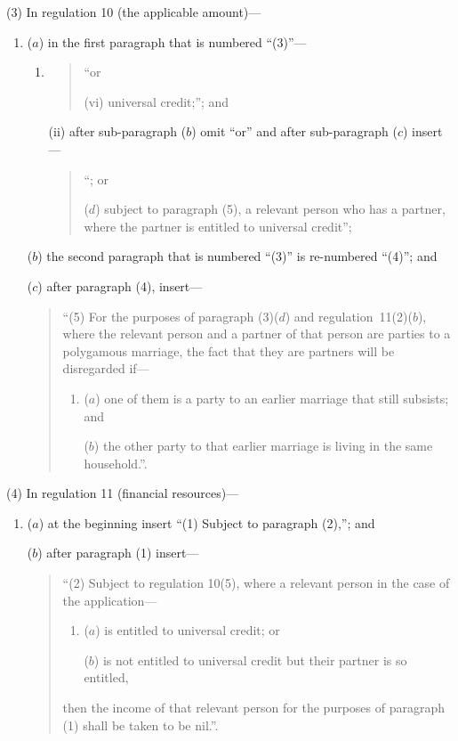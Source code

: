 \documentclass[12pt,a4paper]{article}
\begin{document}
(3) In regulation 10 (the applicable amount)—
\begin{enumerate}\item[]
($a$) in the first paragraph that is numbered “(3)”—
\begin{enumerate}\item[]
\begin{sloppypar}
\end{sloppypar}
\begin{quotation}
“or

(vi) universal credit;”; and
\end{quotation}

(ii) after sub-paragraph ($b$)  omit “or” and after sub-paragraph ($c$)  insert—
\begin{quotation}
“; or

($d$) subject to paragraph (5), a relevant person who has a partner, where the partner is entitled to universal credit”;
\end{quotation}
\end{enumerate}

($b$) the second paragraph that is numbered “(3)” is re-numbered “(4)”; and

($c$) after paragraph (4), insert—
\begin{quotation}
“(5) For the purposes of paragraph (3)($d$)  and regulation~11(2)($b$), where the relevant person and a partner of that person are parties to a polygamous marriage, the fact that they are partners will be disregarded if—
\begin{enumerate}\item[]
($a$) one of them is a party to an earlier marriage that still subsists; and

($b$) the other party to that earlier marriage is living in the same household.”.
\end{enumerate}
\end{quotation}
\end{enumerate}

(4) In regulation 11 (financial resources)—
\begin{enumerate}\item[]
($a$) at the beginning insert “(1) Subject to paragraph (2),”; and

($b$) after paragraph (1) insert—
\begin{quotation}
“(2) Subject to regulation 10(5), where a relevant person in the case of the application—
\begin{enumerate}\item[]
($a$) is entitled to universal credit; or

($b$) is not entitled to universal credit but their partner is so entitled,
\end{enumerate}
then the income of that relevant person for the purposes of paragraph (1) shall be taken to be nil.”.
\end{quotation}
\end{enumerate}
\end{document}
